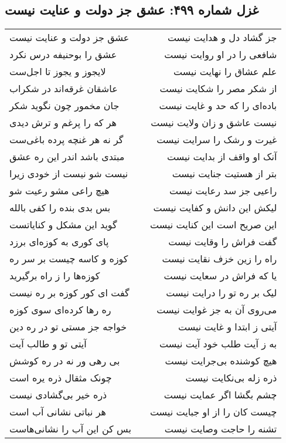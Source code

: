 \begin{center}
\section*{غزل شماره ۴۹۹: عشق جز دولت و عنایت نیست}
\label{sec:0499}
\begin{longtable}{l p{0.5cm} r}
عشق جز دولت و عنایت نیست
&&
جز گشاد دل و هدایت نیست
\\
عشق را بوحنیفه درس نکرد
&&
شافعی را در او روایت نیست
\\
لایجوز و یجوز تا اجل‌ست
&&
علم عشاق را نهایت نیست
\\
عاشقان غرقه‌اند در شکراب
&&
از شکر مصر را شکایت نیست
\\
جان مخمور چون نگوید شکر
&&
باده‌ای را که حد و غایت نیست
\\
هر که را پرغم و ترش دیدی
&&
نیست عاشق و زان ولایت نیست
\\
گر نه هر غنچه پرده باغی‌ست
&&
غیرت و رشک را سرایت نیست
\\
مبتدی باشد اندر این ره عشق
&&
آنک او واقف از بدایت نیست
\\
نیست شو نیست از خودی زیرا
&&
بتر از هستیت جنایت نیست
\\
هیچ راعی مشو رعیت شو
&&
راعیی جز سد رعایت نیست
\\
بس بدی بنده را کفی بالله
&&
لیکش این دانش و کفایت نیست
\\
گوید این مشکل و کنایاتست
&&
این صریح است این کنایت نیست
\\
پای کوری به کوزه‌ای برزد
&&
گفت فراش را وقایت نیست
\\
کوزه و کاسه چیست بر سر ره
&&
راه را زین خزف نقایت نیست
\\
کوزه‌ها را ز راه برگیرید
&&
یا که فراش در سعایت نیست
\\
گفت ای کور کوزه بر ره نیست
&&
لیک بر ره تو را درایت نیست
\\
ره رها کرده‌ای سوی کوزه
&&
می‌روی آن به جز غوایت نیست
\\
خواجه جز مستی تو در ره دین
&&
آیتی ز ابتدا و غایت نیست
\\
آیتی تو و طالب آیت
&&
به ز آیت طلب خود آیت نیست
\\
بی رهی ور نه در ره کوشش
&&
هیچ کوشنده بی‌جرایت نیست
\\
چونک مثقال ذره یره است
&&
ذره زله بی‌نکایت نیست
\\
ذره خیر بی‌گشادی نیست
&&
چشم بگشا اگر عمایت نیست
\\
هر نباتی نشانی آب است
&&
چیست کان را از او جبایت نیست
\\
بس کن این آب را نشانی‌هاست
&&
تشنه را حاجت وصایت نیست
\\
\end{longtable}
\end{center}
